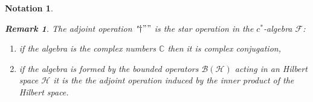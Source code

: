 \documentclass[aps, preprint]{revtex4}
\newtheorem{notation}[theorem]{Notation}
\newtheorem{remark}[theorem]{Remark}
\begin{document}
\begin{notation}
\begin{remark}
The adjoint operation "$ \dag ""$ is the star operation in the $c^{ \ast }$-algebra $\mathcal{F}$: 


\begin{enumerate}
\item if the algebra is the complex numbers $\mathbb{C}$ then it is complex conjugation, 

\item if the algebra is formed by the bounded
operators $\mathcal{B} \left (\mathcal{H}\right )$ acting in an Hilbert space $\mathcal{H}$ it is the the adjoint operation induced by the inner product of the Hilbert space. \end{enumerate}
\end{remark}


\end{notation}
\end{document}
